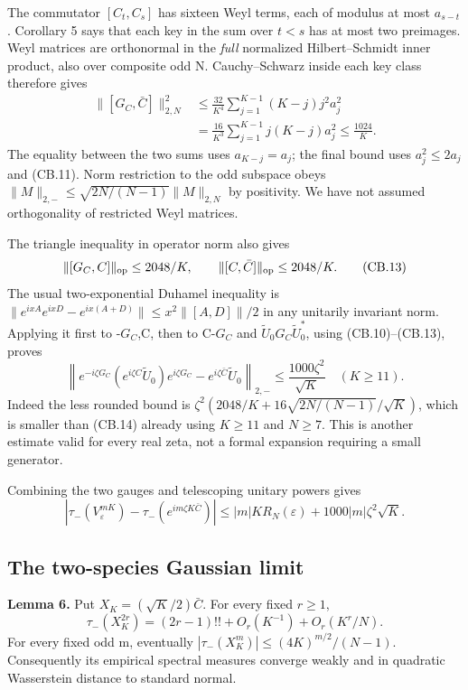 The commutator \([C_t,C_s]\) has sixteen Weyl terms, each of modulus at most \(a_{s-t}\). Corollary 5 says that each key in the sum over \(t<s\) has at most two preimages. Weyl matrices are orthonormal in the \emph{full} normalized Hilbert--Schmidt inner product, also over composite odd N. Cauchy--Schwarz inside each key class therefore gives \[
 \begin{split}
 \|[G_C,\bar C]\|_{2,N}^2
 &\leq\frac{32}{K^4}\sum_{j=1}^{K-1}(K-j)j^2a_j^2\\
 &=\frac{16}{K^3}\sum_{j=1}^{K-1}j(K-j)a_j^2
 \leq\frac{1024}{K}.
 \end{split}                                                    \tag{CB.12}
\] The equality between the two sums uses \(a_{K-j}=a_j\); the final bound uses \(a_j^2\leq2a_j\) and (CB.11). Norm restriction to the odd subspace obeys \(\|M\|_{2,-}\leq\sqrt{2N/(N-1)}\|M\|_{2,N}\) by positivity. We have not assumed orthogonality of restricted Weyl matrices.

The triangle inequality in operator norm also gives \[
 \|[G_C,C]\|_{\rm op}\leq2048/K,\qquad
 \|[C,\bar C]\|_{\rm op}\leq2048/K.                           \tag{CB.13}
\] The usual two-exponential Duhamel inequality is \(\|e^{ixA}e^{ixD}-e^{ix(A+D)}\|\leq x^2\|[A,D]\|/2\) in any unitarily invariant norm. Applying it first to -\(G_{C}\),C, then to C-\(G_{C}\) and \(\widetilde U_0G_C\widetilde U_0^*\), using (CB.10)--(CB.13), proves \[
 \left\|e^{-i\zeta G_C}(e^{i\zeta C}\widetilde U_0)e^{i\zeta G_C}
                        -e^{i\zeta\bar C}\widetilde U_0\right\|_{2,-}
 \leq\frac{1000\zeta^2}{\sqrt K}\quad(K\geq11).               \tag{CB.14}
\] Indeed the less rounded bound is \(\zeta^2(2048/K+16\sqrt{2N/(N-1)}/\sqrt K)\), which is smaller than (CB.14) already using \(K\geq11\) and \(N\geq7\). This is another estimate valid for every real zeta, not a formal expansion requiring a small generator.

Combining the two gauges and telescoping unitary powers gives \[
 \left|\tau_-(V_\varepsilon^{mK})-
          \tau_-(e^{im\zeta K\bar C})\right|
 \leq |m|KR_N(\varepsilon)+1000|m|\zeta^2\sqrt K.              \tag{CB.15}
\]

\subsection{The two-species Gaussian limit}\label{coboundary:the-two-species-gaussian-limit}

\textbf{Lemma 6.} Put \(X_K=(\sqrt K/2)\bar C\). For every fixed \(r\geq1\), \[
 \tau_-(X_K^{2r})=(2r-1)!!+O_r(K^{-1})+O_r(K^r/N).             \tag{CB.16}
\] For every fixed odd m, eventually \(|\tau_-(X_K^m)|\leq(4K)^{m/2}/(N-1)\). Consequently its empirical spectral measures converge weakly and in quadratic Wasserstein distance to standard normal.

